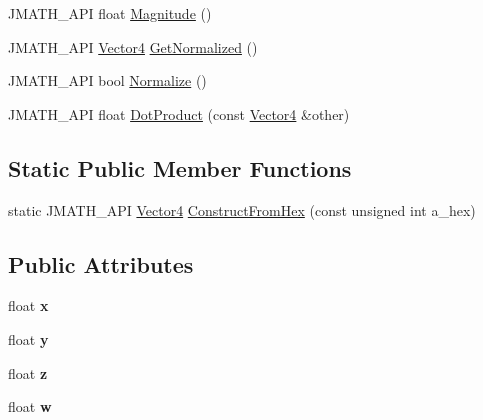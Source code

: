 \begin{DoxyCompactItemize}
\item 
J\+M\+A\+T\+H\+\_\+\+A\+P\+I float \hyperlink{class_vector4_aa60ab90aae8251b2a37e1ebc95a3afe3}{Magnitude} ()
\item 
J\+M\+A\+T\+H\+\_\+\+A\+P\+I \hyperlink{class_vector4}{Vector4} \hyperlink{class_vector4_aa0cb14aa93f33e8d82686aced6e93767}{Get\+Normalized} ()
\item 
J\+M\+A\+T\+H\+\_\+\+A\+P\+I bool \hyperlink{class_vector4_a82c70565aa57e4290f982da8902c2a73}{Normalize} ()
\item 
J\+M\+A\+T\+H\+\_\+\+A\+P\+I float \hyperlink{class_vector4_a374731a22101eb94bf2efd829e9472bc}{Dot\+Product} (const \hyperlink{class_vector4}{Vector4} \&other)
\end{DoxyCompactItemize}
\subsection*{Static Public Member Functions}
\begin{DoxyCompactItemize}
\item 
static J\+M\+A\+T\+H\+\_\+\+A\+P\+I \hyperlink{class_vector4}{Vector4} \hyperlink{class_vector4_a1cd0e1e400fd06d20aaaa9bb87ad71cf}{Construct\+From\+Hex} (const unsigned int a\+\_\+hex)
\end{DoxyCompactItemize}
\subsection*{Public Attributes}
\begin{DoxyCompactItemize}
\item 
\hypertarget{class_vector4_a1cc671b8b90e1b8145e74f128d828fbe}{float {\bfseries x}}\label{class_vector4_a1cc671b8b90e1b8145e74f128d828fbe}

\item 
\hypertarget{class_vector4_a72ef7eedea2e006cf6a64fe192088509}{float {\bfseries y}}\label{class_vector4_a72ef7eedea2e006cf6a64fe192088509}

\item 
\hypertarget{class_vector4_aa0d02112e7661ac9b90d1c17c8f1b1e6}{float {\bfseries z}}\label{class_vector4_aa0d02112e7661ac9b90d1c17c8f1b1e6}

\item 
\hypertarget{class_vector4_a988ad29d481ee14c5c6c35dbdf58c559}{float {\bfseries w}}\label{class_vector4_a988ad29d481ee14c5c6c35dbdf58c559}

\end{DoxyCompactItemize}
